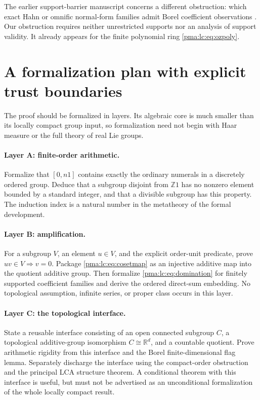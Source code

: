 \documentclass[11pt]{article}
\numberwithin{equation}{section}
\theoremstyle{definition}
\theoremstyle{remark}
\newcommand{\Z}{\mathbb Z}
\newcommand{\R}{\mathbb R}
\begin{document}
The earlier support-barrier manuscript concerns a different obstruction:
which exact Hahn or omnific normal-form families admit Borel coefficient
observations \cite{s08:PriorBorel}. Our obstruction requires neither
unrestricted supports nor an analysis of support validity. It already
appears for the finite polynomial ring \eqref{pma:lc:eq:ozpoly}.

\section{A formalization plan with explicit trust boundaries}
\label{pma:lc:sec:formalization}

The proof should be formalized in layers. Its algebraic core is much
smaller than its locally compact group input, so formalization need not
begin with Haar measure or the full theory of real Lie groups.

\paragraph{Layer A: finite-order arithmetic.}
Formalize that $[0,n1]$ contains exactly the ordinary numerals in a
discretely ordered group. Deduce that a subgroup disjoint from $\Z1$
has no nonzero element bounded by a standard integer, and that a
divisible subgroup has this property. The induction index is a natural
number in the metatheory of the formal development.

\paragraph{Layer B: amplification.}
For a subgroup $V$, an element $u\in V$, and the explicit order-unit
predicate, prove $uv\in V\Rightarrow v=0$. Package
\eqref{pma:lc:eq:cosetmap} as an injective additive map into the quotient
additive group. Then formalize \eqref{pma:lc:eq:domination} for finitely
supported coefficient families and derive the ordered direct-sum
embedding. No topological assumption, infinite series, or proper class
occurs in this layer.

\paragraph{Layer C: the topological interface.}
State a reusable interface consisting of an open connected subgroup
$C$, a topological additive-group isomorphism $C\cong\R^d$, and a
countable quotient. Prove arithmetic rigidity from this interface and
the Borel finite-dimensional flag lemma. Separately discharge the
interface using the compact-order obstruction and the principal LCA
structure theorem. A conditional theorem with this interface is useful,
but must not be advertised as an unconditional formalization of the
whole locally compact result.
\end{document}
